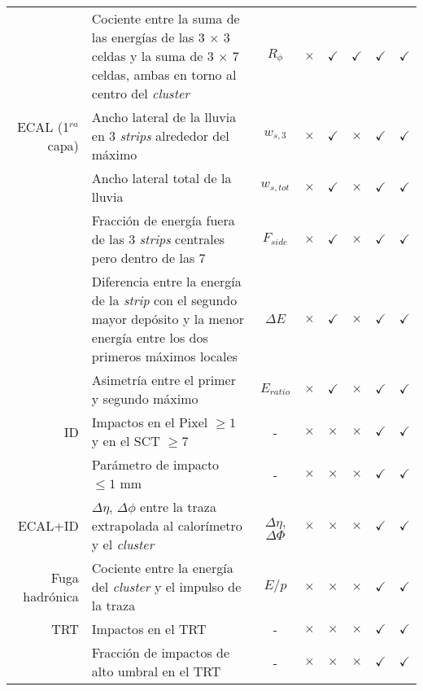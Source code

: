 \begin{table}
\begin{threeparttable}
\begin{tabular}{ r p{8cm} c | c c | c c c }
		& Cociente entre la suma de las energías de las 3 $\times$ 3 celdas y la suma de 3 $\times$ 7 celdas, ambas en torno al centro del \textit{cluster} & $R_{\phi}$ & $\times$ & $\checkmark$ & $\checkmark$ & $\checkmark$ & $\checkmark$ \\

	ECAL (1$^{ra}$ capa) & Ancho lateral de la lluvia en 3 \textit{strips} alrededor del máximo & $w_{s,3}$ & $\times$ & $\checkmark$ & $\times$ & $\checkmark$ & $\checkmark$ \\

		& Ancho lateral total de la lluvia & $w_{s,tot}$ & $\times$ & $\checkmark$ & $\times$ & $\checkmark$ & $\checkmark$ \\

		& Fracción de energía fuera de las 3 \textit{strips} centrales pero dentro de las 7 & $F_{side}$ & $\times$ & $\checkmark$ & $\times$ & $\checkmark$ & $\checkmark$ \\

		& Diferencia entre la energía de la \textit{strip} con el segundo mayor depósito y la menor energía entre los dos primeros máximos locales & $\Delta E$ & $\times$ & $\checkmark$ & $\times$ & $\checkmark$ & $\checkmark$ \\

		& Asimetría entre el primer y segundo máximo & $E_{ratio}$ & $\times$ & $\checkmark$ & $\times$ & $\checkmark$ & $\checkmark$ \\

	ID & Impactos en el Pixel $\ge 1$ y en el SCT $\ge 7$ & - & $\times$ & $\times$ & $\times$ & $\checkmark$ & $\checkmark$ \\

		& Parámetro de impacto $\le 1$ mm & - & $\times$ & $\times$ & $\times$ & $\checkmark$ & $\checkmark$ \\

	ECAL+ID & $\Delta\eta$, $\Delta\phi$ entre la traza extrapolada al calorímetro y el \textit{cluster} & $\Delta\eta$, $\Delta\Phi$ & $\times$ & $\times$ & $\times$ & $\checkmark$ & $\checkmark$ \\

	Fuga hadrónica & Cociente entre la energía del \textit{cluster} y el impulso de la traza & $E/p$ & $\times$ & $\times$ & $\times$ & $\checkmark$ & $\checkmark$ \\

	TRT & Impactos en el TRT & - & $\times$ & $\times$ & $\times$ & $\checkmark$ & $\checkmark$ \\

		& Fracción de impactos de alto umbral en el TRT & - & $\times$ & $\times$ & $\times$ & $\checkmark$ & $\checkmark$ \\

	\hline

\end{tabular}
\end{threeparttable}
\label{lmttable}
\end{table}
\renewcommand{\arraystretch}{1}

\normalsize
